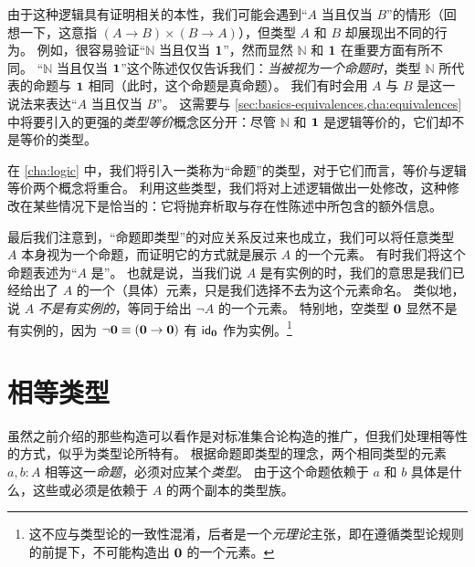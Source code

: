 由于这种逻辑具有证明相关的本性，我们可能会遇到``$A$ 当且仅当 $B$''的情形（回想一下，这意指 $(A\to B)\times (B\to A)$），但类型 $A$ 和 $B$ 却展现出不同的行为。
例如，很容易验证``$\mathbb{N}$ 当且仅当 $\unit$''，然而显然 $\mathbb{N}$ 和 $\unit$ 在重要方面有所不同。
``$\mathbb{N}$ 当且仅当 $\unit$''这个陈述仅仅告诉我们：\emph{当被视为一个命题时}，类型 $\mathbb{N}$ 所代表的命题与 $\unit$ 相同（此时，这个命题是真命题）。
我们有时会用 $A$ 与 $B$ 是这一说法来表达``$A$ 当且仅当 $B$''。
%
%
这需要与 \cref{sec:basics-equivalences,cha:equivalences} 中将要引入的更强的\emph{类型等价}概念区分开：尽管 $\mathbb{N}$ 和 $\unit$ 是逻辑等价的，它们却不是等价的类型。

在 \cref{cha:logic} 中，我们将引入一类称为``命题''的类型，对于它们而言，等价与逻辑等价两个概念将重合。
利用这些类型，我们将对上述逻辑做出一处修改，这种修改在某些情况下是恰当的：它将抛弃析取与存在性陈述中所包含的额外信息。

最后我们注意到，``命题即类型''的对应关系反过来也成立，我们可以将任意类型 $A$ 本身视为一个命题，而证明它的方式就是展示 $A$ 的一个元素。
有时我们将这个命题表述为``$A$ 是''。
%
%
也就是说，当我们说 $A$ 是有实例的时，我们的意思是我们已经给出了 $A$ 的一个（具体）元素，只是我们选择不去为这个元素命名。
类似地，说 $A$ \emph{不是有实例的}，等同于给出 $\neg A$ 的一个元素。
特别地，空类型 $\emptyt$ 显然不是有实例的，因为 $\neg \emptyt \jdeq (\emptyt \to \emptyt)$ 有 $\idfunc[\emptyt]$ 作为实例。\footnote{这不应与类型论的一致性混淆，后者是一个\emph{元理论}主张，即在遵循类型论规则的前提下，不可能构造出 $\emptyt$ 的一个元素。}

%
%
%

\section{相等类型}
\label{sec:identity-types}

%
%
%
%
虽然之前介绍的那些构造可以看作是对标准集合论构造的推广，但我们处理相等性的方式，似乎为类型论所特有。
根据命题即类型的理念，两个相同类型的元素 $a,b:A$ 相等这一\emph{命题}，必须对应某个\emph{类型}。
由于这个命题依赖于 $a$ 和 $b$ 具体是什么，这些或必须是依赖于 $A$ 的两个副本的类型族。

